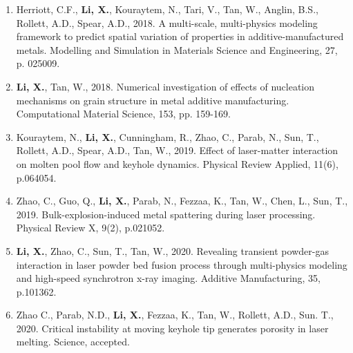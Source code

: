 \documentclass[11pt, letterpaper]{article}
\begin{document}
\begin{enumerate}[leftmargin=*, labelsep=4mm]
   \item Herriott, C.F., \textbf{Li, X.}, Kouraytem, N., Tari, V., Tan, W., Anglin, B.S., Rollett, A.D.,
      Spear, A.D., 2018. A multi-scale, multi-physics modeling framework to predict spatial
      variation of properties in additive-manufactured metals. Modelling and Simulation in
      Materials Science and Engineering, 27, p. 025009.

   \item \textbf{Li, X.}, Tan, W., 2018. Numerical investigation of effects of nucleation mechanisms
      on grain structure in metal additive manufacturing. Computational Material Science, 153, pp.
      159-169.

   \item Kouraytem, N., \textbf{Li, X.}, Cunningham, R., Zhao, C., Parab, N., Sun, T., Rollett,
      A.D., Spear, A.D., Tan, W., 2019. Effect of laser-matter interaction on molten pool flow and
      keyhole dynamics. Physical Review Applied, 11(6), p.064054.

   \item Zhao, C., Guo, Q., \textbf{Li, X.}, Parab, N., Fezzaa, K., Tan, W., Chen, L., Sun, T.,
      2019. Bulk-explosion-induced metal spattering during laser processing. Physical Review X,
      9(2), p.021052.

   \item \textbf{Li, X.}, Zhao, C., Sun, T., Tan, W., 2020. Revealing transient powder-gas
      interaction in laser powder bed fusion process through multi-physics modeling and high-speed
      synchrotron x-ray imaging. Additive Manufacturing, 35, p.101362. 

   \item Zhao C., Parab, N.D., \textbf{Li, X.}, Fezzaa, K., Tan, W., Rollett, A.D., Sun. T., 2020.
      Critical instability at moving keyhole tip generates porosity in laser melting. Science,
      accepted. 
\end{enumerate}
\end{document}
